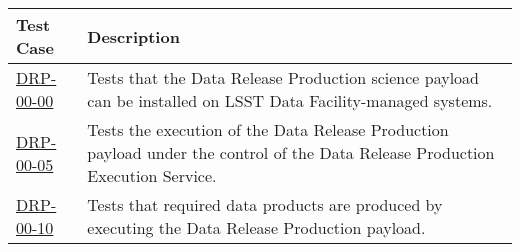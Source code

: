 \begin{longtable} {|p{}|p{}|}\hline
\textbf{Test Case}  & \textbf{Description} \\\hline

\hyperref[drp-00-00]{DRP-00-00} & Tests that the Data Release Production science payload can be installed on LSST Data Facility-managed systems.\\\hline
\hyperref[drp-00-05]{DRP-00-05} & Tests the execution of the Data Release Production payload under the control of the Data Release Production Execution Service.\\\hline
\hyperref[drp-00-10]{DRP-00-10} & Tests that required data products are produced by executing the Data Release Production payload. \\\hline

\end{longtable}
